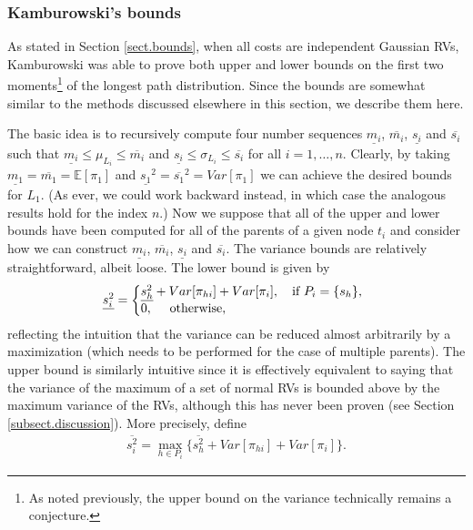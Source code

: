 \documentclass[12pt]{article}
\def\E{\mathbb{E}}
\begin{document}
\subsubsection{Kamburowski's bounds}
\label{subsubsect.kamburowski}

As stated in Section \ref{sect.bounds}, when all costs are independent Gaussian RVs, Kamburowski was able to prove both upper and lower bounds on the first two moments\footnote{As noted previously, the upper bound on the variance technically remains a conjecture.} of the longest path distribution. Since the bounds are somewhat similar to the methods discussed elsewhere in this section, we describe them here.

The basic idea is to recursively compute four number sequences $\underline{m_i}$, $\overline{m_i}$, $\underline{s_i}$ and  $\overline{s_i}$ such that $\underline{m_i} \leq \mu_{L_i} \leq \overline{m_i}$ and $ \underline{s_i} \leq \sigma_{L_i} \leq \overline{s_i}$ for all $i = 1, \dots, n$. Clearly, by taking $\underline{m_1} = \overline{m_1} = \E[\pi_1]$ and $\underline{s_1}^2 = \overline{s_1}^2 = Var[\pi_1]$ we can achieve the desired bounds for $L_1$. (As ever, we could work backward instead, in which case the analogous results hold for the index $n$.) Now we suppose that all of the upper and lower bounds have been computed for all of the parents of a given node $t_i$ and consider how we can construct  $\underline{m_i}$, $\overline{m_i}$, $\underline{s_i}$ and  $\overline{s_i}$. The variance bounds are relatively straightforward, albeit loose. The lower bound is given by
\begin{equation}
\underline{s_i^2} =\left\{
\begin{array}{@{}ll@{}}
\underline{s_h^2} + Var[\pi_{hi}] + Var[\pi_{i}], \quad  \text{if $P_i = \{s_h\}$,} \\
0,  \quad \text{ otherwise},
\end{array}\right.
\label{eq.si_under}
\end{equation}
reflecting the intuition that the variance can be reduced almost arbitrarily by a maximization (which needs to be performed for the case of multiple parents). The upper bound is similarly intuitive since it is effectively equivalent to saying that the variance of the maximum of a set of normal RVs is bounded above by the maximum variance of the RVs, although this has never been proven (see Section \ref{subsect.discussion}). More precisely, define 
\begin{align}
  \label{eq.si_over}
  \overline{s_i^2} = \max_{h \in P_i}\{ \overline{s_h^2} + Var[\pi_{hi}] + Var[\pi_{i}]\}.
\end{align}
\end{document}
